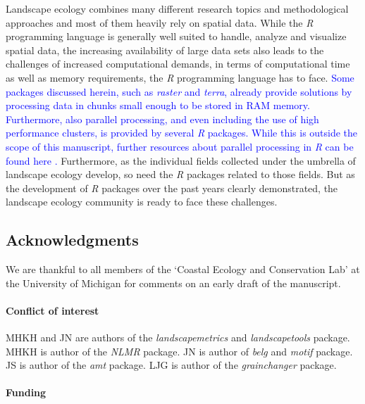 \documentclass[smallextended]{svjour3}       %
\begin{document}
Landscape ecology combines many different research topics and methodological approaches and most of them heavily rely on spatial data.
While the \textit{R} programming language is generally well suited to handle, analyze and visualize spatial data, the increasing availability of large data sets also leads to the challenges of increased computational demands, in terms of computational time as well as memory requirements, the \textit{R} programming language has to face.
\textcolor{blue}{Some packages discussed herein, such as \textit{raster} and \textit{terra}, already provide solutions by processing data in chunks small enough to be stored in RAM memory.
Furthermore, also parallel processing, and even including the use of high performance clusters, is provided by several \textit{R} packages. 
While this is outside the scope of this manuscript, further resources about parallel processing in \textit{R} can be found here \cite{Bengtsson2020,Schubert2019,McCallum2012}.}
Furthermore, as the individual fields collected under the umbrella of landscape ecology develop, so need the \textit{R} packages related to those fields.
But as the development of \textit{R} packages over the past years clearly demonstrated, the landscape ecology community is ready to face these challenges.

\FloatBarrier

\hypertarget{acknowledgments}{%
\subsection{Acknowledgments}\label{acknowledgments}}

We are thankful to all members of the `Coastal Ecology and Conservation Lab' at the University of Michigan for comments on an early draft of the manuscript.

\hypertarget{conflict-of-interest}{%
\paragraph{Conflict of interest}\label{conflict-of-interest}}

MHKH and JN are authors of the \textit{landscapemetrics} and \textit{landscapetools} package.
MHKH is author of the \textit{NLMR} package.
JN is author of \textit{belg} and \textit{motif} package. JS is author of the \textit{amt} package. LJG is author of the \textit{grainchanger} package.

\hypertarget{funding}{%
\paragraph{Funding}\label{funding}}
\end{document}
